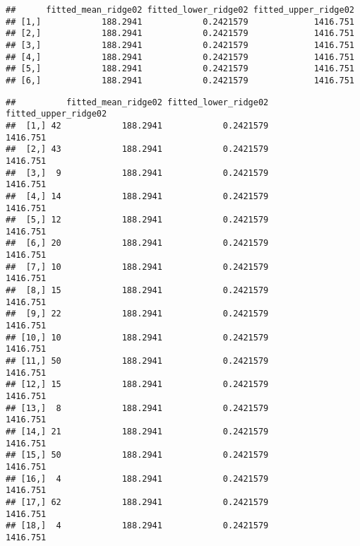 \documentclass[]{article}
\newenvironment{Shaded}{\begin{snugshade}}{\end{snugshade}}
\newcommand{\CommentTok}[1]{\textcolor[rgb]{0.56,0.35,0.01}{\textit{#1}}}
\newcommand{\KeywordTok}[1]{\textcolor[rgb]{0.13,0.29,0.53}{\textbf{#1}}}
\newcommand{\NormalTok}[1]{#1}
\newcommand{\OperatorTok}[1]{\textcolor[rgb]{0.81,0.36,0.00}{\textbf{#1}}}
\begin{document}
\begin{verbatim}
##      fitted_mean_ridge02 fitted_lower_ridge02 fitted_upper_ridge02
## [1,]            188.2941            0.2421579             1416.751
## [2,]            188.2941            0.2421579             1416.751
## [3,]            188.2941            0.2421579             1416.751
## [4,]            188.2941            0.2421579             1416.751
## [5,]            188.2941            0.2421579             1416.751
## [6,]            188.2941            0.2421579             1416.751
\end{verbatim}

\begin{Shaded}
\end{Shaded}

\begin{verbatim}
##          fitted_mean_ridge02 fitted_lower_ridge02 fitted_upper_ridge02
##  [1,] 42            188.2941            0.2421579             1416.751
##  [2,] 43            188.2941            0.2421579             1416.751
##  [3,]  9            188.2941            0.2421579             1416.751
##  [4,] 14            188.2941            0.2421579             1416.751
##  [5,] 12            188.2941            0.2421579             1416.751
##  [6,] 20            188.2941            0.2421579             1416.751
##  [7,] 10            188.2941            0.2421579             1416.751
##  [8,] 15            188.2941            0.2421579             1416.751
##  [9,] 22            188.2941            0.2421579             1416.751
## [10,] 10            188.2941            0.2421579             1416.751
## [11,] 50            188.2941            0.2421579             1416.751
## [12,] 15            188.2941            0.2421579             1416.751
## [13,]  8            188.2941            0.2421579             1416.751
## [14,] 21            188.2941            0.2421579             1416.751
## [15,] 50            188.2941            0.2421579             1416.751
## [16,]  4            188.2941            0.2421579             1416.751
## [17,] 62            188.2941            0.2421579             1416.751
## [18,]  4            188.2941            0.2421579             1416.751
\end{verbatim}
\end{document}
